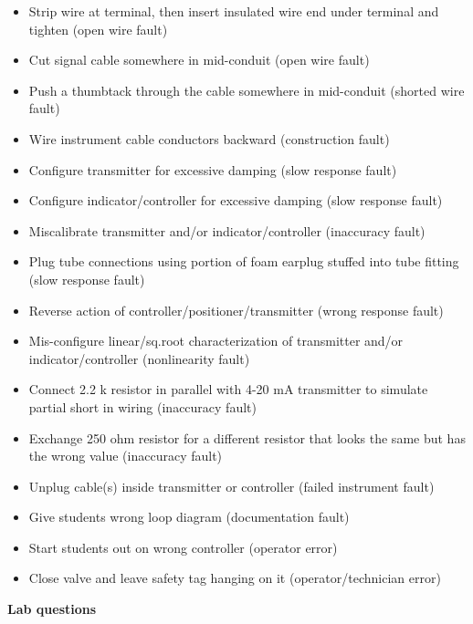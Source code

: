 \begin{itemize}
\goodbreak
\item{} Strip wire at terminal, then insert insulated wire end under terminal and tighten (open wire fault)
\item{} Cut signal cable somewhere in mid-conduit (open wire fault)
\item{} Push a thumbtack through the cable somewhere in mid-conduit (shorted wire fault)
\item{} Wire instrument cable conductors backward (construction fault)
\item{} Configure transmitter for excessive damping (slow response fault)
\item{} Configure indicator/controller for excessive damping (slow response fault)
\item{} Miscalibrate transmitter and/or indicator/controller (inaccuracy fault)
\item{} Plug tube connections using portion of foam earplug stuffed into tube fitting (slow response fault)
\item{} Reverse action of controller/positioner/transmitter (wrong response fault)
\item{} Mis-configure linear/sq.root characterization of transmitter and/or indicator/controller (nonlinearity fault)
\item{} Connect 2.2 k resistor in parallel with 4-20 mA transmitter to simulate partial short in wiring (inaccuracy fault)
\item{} Exchange 250 ohm resistor for a different resistor that looks the same but has the wrong value (inaccuracy fault) 
\item{} Unplug cable(s) inside transmitter or controller (failed instrument fault)
\item{} Give students wrong loop diagram (documentation fault)
\item{} Start students out on wrong controller (operator error)
\item{} Close valve and leave safety tag hanging on it (operator/technician error)
\end{itemize}
















\vfil \eject

\noindent
{\bf Lab questions}

